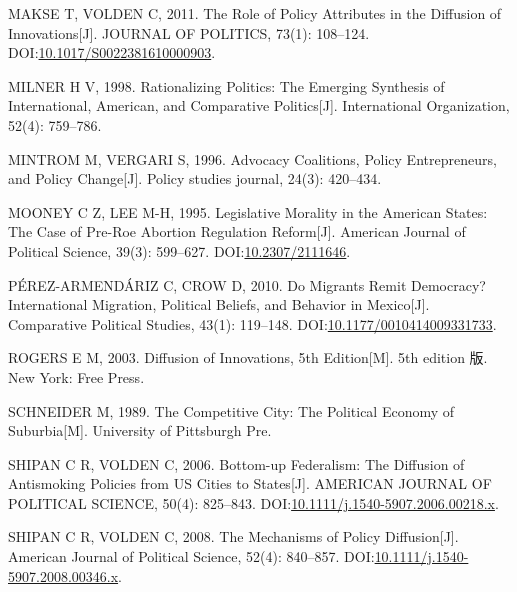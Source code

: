 \documentclass[
  12pt,
]{ctexart}
\newlength{\cslhangindent}
\newlength{\cslentryspacingunit} %
\newenvironment{CSLReferences}[2] %
 {%
  \setlength{\parindent}{0pt}
  \ifodd #1
  \let\oldpar\par
  \def\par{\hangindent=\cslhangindent\oldpar}
  \fi
  \setlength{\parskip}{#2\cslentryspacingunit}
 }%
 {}
\begin{document}
\begin{CSLReferences}{1}{0}
\leavevmode{}%
MAKSE T, VOLDEN C, 2011. The {Role} of {Policy Attributes} in the {Diffusion} of {Innovations}{[}J{]}. JOURNAL OF POLITICS, 73(1): 108--124. DOI:\href{https://doi.org/10.1017/S0022381610000903}{10.1017/S0022381610000903}.

\leavevmode{}%
MILNER H V, 1998. Rationalizing Politics: {The} Emerging Synthesis of International, {American}, and Comparative Politics{[}J{]}. International Organization, 52(4): 759--786.

\leavevmode{}%
MINTROM M, VERGARI S, 1996. Advocacy Coalitions, Policy Entrepreneurs, and Policy Change{[}J{]}. Policy studies journal, 24(3): 420--434.

\leavevmode{}%
MOONEY C Z, LEE M-H, 1995. Legislative {Morality} in the {American States}: {The Case} of {Pre-Roe Abortion Regulation Reform}{[}J{]}. American Journal of Political Science, 39(3): 599--627. DOI:\href{https://doi.org/10.2307/2111646}{10.2307/2111646}.

\leavevmode{}%
PÉREZ-ARMENDÁRIZ C, CROW D, 2010. Do {Migrants Remit Democracy}? {International Migration}, {Political Beliefs}, and {Behavior} in {Mexico}{[}J{]}. Comparative Political Studies, 43(1): 119--148. DOI:\href{https://doi.org/10.1177/0010414009331733}{10.1177/0010414009331733}.

\leavevmode{}%
ROGERS E M, 2003. Diffusion of {Innovations}, 5th {Edition}{[}M{]}. 5th edition 版. {New York}: {Free Press}.

\leavevmode{}%
SCHNEIDER M, 1989. The Competitive City: {The} Political Economy of Suburbia{[}M{]}. {University of Pittsburgh Pre}.

\leavevmode{}%
SHIPAN C R, VOLDEN C, 2006. Bottom-up Federalism: {The} Diffusion of Antismoking Policies from {US} Cities to States{[}J{]}. AMERICAN JOURNAL OF POLITICAL SCIENCE, 50(4): 825--843. DOI:\href{https://doi.org/10.1111/j.1540-5907.2006.00218.x}{10.1111/j.1540-5907.2006.00218.x}.

\leavevmode{}%
SHIPAN C R, VOLDEN C, 2008. The {Mechanisms} of {Policy Diffusion}{[}J{]}. American Journal of Political Science, 52(4): 840--857. DOI:\href{https://doi.org/10.1111/j.1540-5907.2008.00346.x}{10.1111/j.1540-5907.2008.00346.x}.


\end{CSLReferences}
\end{document}
